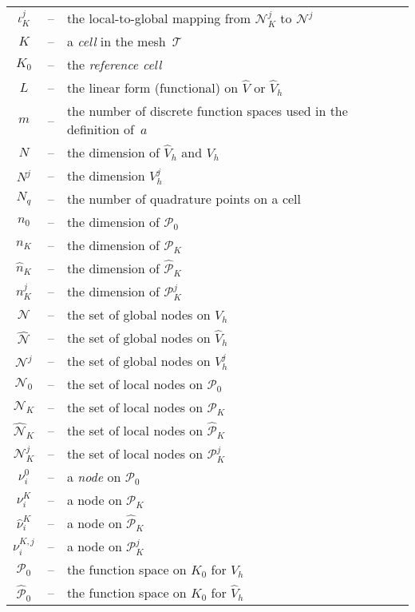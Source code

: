 \begin{longtable}{ccl}
    $\iota_K^j$ &--&
    the local-to-global mapping from $\mathcal{N}_K^j$ to $\mathcal{N}^j$ \\
    $K$ &--&
    a \emph{cell} in the mesh~$\mathcal{T}$ \\
    $K_0$ &--&
    the \emph{reference cell} \\
    $L$ &--&
    the linear form (functional) on $\hat{V}$ or $\hat{V}_h$ \\
    $m$ &--&
    the number of discrete function spaces used in the definition of~$a$ \\
    $N$ &--&
    the dimension of $\hat{V}_h$ and $V_h$ \\
    $N^j$ &--&
    the dimension $V_h^j$ \\
    $N_q$ &--&
    the number of quadrature points on a cell \\
    $n_0$ &--&
    the dimension of $\mathcal{P}_0$ \\
    $n_K$ &--&
    the dimension of $\mathcal{P}_K$ \\
    $\hat{n}_K$ &--&
    the dimension of $\hat{\mathcal{P}}_K$ \\
    $n_K^j$ &--&
    the dimension of $\mathcal{P}_K^j$ \\
    $\mathcal{N}$ &--&
    the set of global nodes on $V_h$ \\
    $\hat{\mathcal{N}}$ &--&
    the set of global nodes on $\hat{V}_h$ \\
    $\mathcal{N}^j$ &--&
    the set of global nodes on $V_h^j$ \\
    $\mathcal{N}_0$ &--&
    the set of local nodes on $\mathcal{P}_0$ \\
    $\mathcal{N}_K$ &--&
    the set of local nodes on $\mathcal{P}_K$ \\
    $\hat{\mathcal{N}}_K$ &--&
    the set of local nodes on $\hat{\mathcal{P}}_K$ \\
    $\mathcal{N}_K^j$ &--&
    the set of local nodes on ${\mathcal{P}_K^j}$ \\
    $\nu^0_i$ &--&
    a \emph{node} on $\mathcal{P}_0$ \\
    $\nu^K_i$ &--&
    a node on $\mathcal{P}_K$ \\
    $\hat{\nu}^K_i$ &--&
    a node on $\hat{\mathcal{P}}_K$ \\
    $\nu^{K,j}_i$ &--&
    a node on $\mathcal{P}_K^j$ \\
    $\mathcal{P}_0$ &--&
    the function space on $K_0$ for $V_h$ \\
    $\hat{\mathcal{P}}_0$ &--&
    the function space on $K_0$ for $\hat{V}_h$ \\

\end{longtable}
